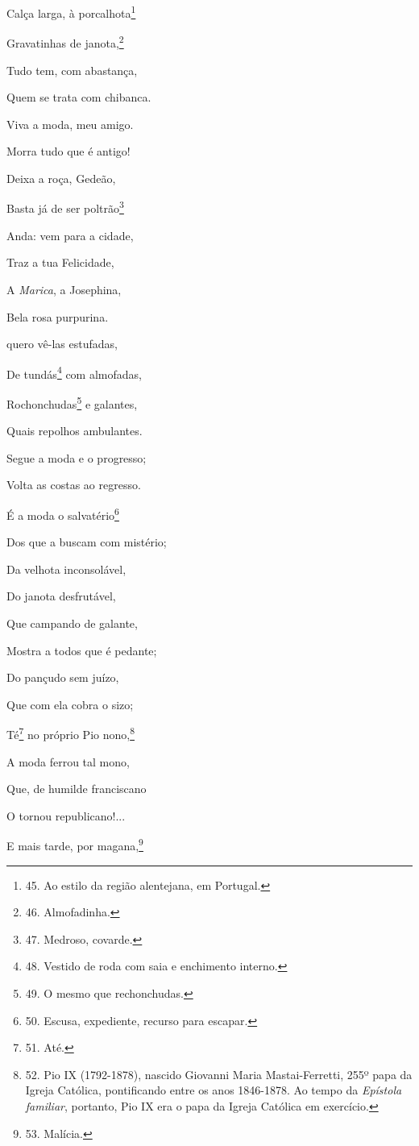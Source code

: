 Calça larga, à porcalhota\footnote{45. Ao estilo da região alentejana,
  em Portugal.}

Gravatinhas de janota,\footnote{46. Almofadinha.}

Tudo tem, com abastança,

Quem se trata com chibanca.

Viva a moda, meu amigo.

Morra tudo que é antigo!

Deixa a roça, Gedeão,

Basta já de ser poltrão\footnote{47. Medroso, covarde.}

Anda: vem para a cidade,

Traz a tua Felicidade,

A \emph{Marica}, a Josephina,

Bela rosa purpurina.

quero vê-las estufadas,

De tundás\footnote{48. Vestido de roda com saia e enchimento interno.}
com almofadas,

Rochonchudas\footnote{49. O mesmo que rechonchudas.} e galantes,

Quais repolhos ambulantes.

Segue a moda e o progresso;

Volta as costas ao regresso.

É a moda o salvatério\footnote{50. Escusa, expediente, recurso para
  escapar.}

Dos que a buscam com mistério;

Da velhota inconsolável,

Do janota desfrutável,

Que campando de galante,

Mostra a todos que é pedante;

Do pançudo sem juízo,

Que com ela cobra o sizo;

Té\footnote{51. Até.} no próprio Pio nono,\footnote{52. Pio IX
  (1792-1878), nascido Giovanni Maria Mastai-Ferretti, 255º papa da
  Igreja Católica, pontificando entre os anos 1846-1878. Ao tempo da
  \emph{Epístola familiar}, portanto, Pio IX era o papa da Igreja
  Católica em exercício.}

A moda ferrou tal mono,

Que, de humilde franciscano

O tornou republicano!...

E mais tarde, por magana,\footnote{53. Malícia.}

